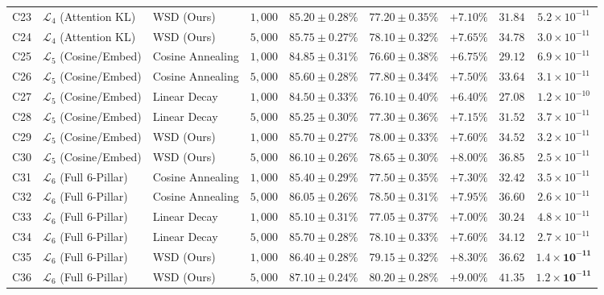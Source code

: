 \begin{table}[t]
{\begin{tabular}{@{} c l l c c c c c c @{}}
C23 & $\mathcal{L}_4$ (Attention KL) & WSD (Ours)      & $1{,}000$ & $85.20 \pm 0.28\%$ & $77.20 \pm 0.35\%$ & $+7.10\%$ & $31.84$ & $5.2 \times 10^{-11}$ \\
C24 & $\mathcal{L}_4$ (Attention KL) & WSD (Ours)      & $5{,}000$ & $85.75 \pm 0.27\%$ & $78.10 \pm 0.32\%$ & $+7.65\%$ & $34.78$ & $3.0 \times 10^{-11}$ \\
\midrule
C25 & $\mathcal{L}_5$ (Cosine/Embed) & Cosine Annealing & $1{,}000$ & $84.85 \pm 0.31\%$ & $76.60 \pm 0.38\%$ & $+6.75\%$ & $29.12$ & $6.9 \times 10^{-11}$ \\
C26 & $\mathcal{L}_5$ (Cosine/Embed) & Cosine Annealing & $5{,}000$ & $85.60 \pm 0.28\%$ & $77.80 \pm 0.34\%$ & $+7.50\%$ & $33.64$ & $3.1 \times 10^{-11}$ \\
C27 & $\mathcal{L}_5$ (Cosine/Embed) & Linear Decay    & $1{,}000$ & $84.50 \pm 0.33\%$ & $76.10 \pm 0.40\%$ & $+6.40\%$ & $27.08$ & $1.2 \times 10^{-10}$ \\
C28 & $\mathcal{L}_5$ (Cosine/Embed) & Linear Decay    & $5{,}000$ & $85.25 \pm 0.30\%$ & $77.30 \pm 0.36\%$ & $+7.15\%$ & $31.52$ & $3.7 \times 10^{-11}$ \\
C29 & $\mathcal{L}_5$ (Cosine/Embed) & WSD (Ours)      & $1{,}000$ & $85.70 \pm 0.27\%$ & $78.00 \pm 0.33\%$ & $+7.60\%$ & $34.52$ & $3.2 \times 10^{-11}$ \\
C30 & $\mathcal{L}_5$ (Cosine/Embed) & WSD (Ours)      & $5{,}000$ & $86.10 \pm 0.26\%$ & $78.65 \pm 0.30\%$ & $+8.00\%$ & $36.85$ & $2.5 \times 10^{-11}$ \\
\midrule
C31 & $\mathcal{L}_6$ (Full 6-Pillar) & Cosine Annealing & $1{,}000$ & $85.40 \pm 0.29\%$ & $77.50 \pm 0.35\%$ & $+7.30\%$ & $32.42$ & $3.5 \times 10^{-11}$ \\
C32 & $\mathcal{L}_6$ (Full 6-Pillar) & Cosine Annealing & $5{,}000$ & $86.05 \pm 0.26\%$ & $78.50 \pm 0.31\%$ & $+7.95\%$ & $36.60$ & $2.6 \times 10^{-11}$ \\
C33 & $\mathcal{L}_6$ (Full 6-Pillar) & Linear Decay    & $1{,}000$ & $85.10 \pm 0.31\%$ & $77.05 \pm 0.37\%$ & $+7.00\%$ & $30.24$ & $4.8 \times 10^{-11}$ \\
C34 & $\mathcal{L}_6$ (Full 6-Pillar) & Linear Decay    & $5{,}000$ & $85.70 \pm 0.28\%$ & $78.10 \pm 0.33\%$ & $+7.60\%$ & $34.12$ & $2.7 \times 10^{-11}$ \\
C35 & $\mathcal{L}_6$ (Full 6-Pillar) & WSD (Ours)      & $1{,}000$ & $\mathbf{86.40 \pm 0.28\%}$ & $\mathbf{79.15 \pm 0.32\%}$ & $\mathbf{+8.30\%}$ & $\mathbf{36.62}$ & $\mathbf{1.4 \times 10^{-11}}$ \\
C36 & $\mathcal{L}_6$ (Full 6-Pillar) & WSD (Ours)      & $5{,}000$ & $\mathbf{87.10 \pm 0.24\%}$ & $\mathbf{80.20 \pm 0.28\%}$ & $\mathbf{+9.00\%}$ & $\mathbf{41.35}$ & $\mathbf{1.2 \times 10^{-11}}$ \\
\bottomrule
\end{tabular}
}
\end{table}

